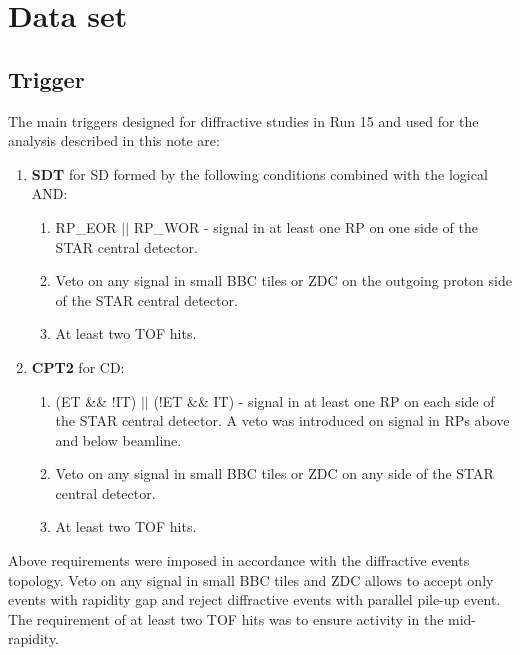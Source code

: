 

\chapter{Data set}\label{chap:dataset}
\section{Trigger}
The main triggers designed for diffractive studies in Run 15 and used for the analysis described in this note  are:
\begin{enumerate}[label=\alph*)]
	\item \textbf{SDT} for SD formed by the following conditions combined with the logical AND:
	\begin{enumerate}[label=\arabic*.]
		\item RP\_EOR $\vert\vert$ RP\_WOR - signal in at least one RP on one side of the STAR central detector.
		\item Veto on any signal in small BBC tiles or ZDC on the outgoing proton side of the STAR central detector.
		\item At least two TOF hits.
	\end{enumerate}
	\item \textbf{CPT2} for CD: 
	\begin{enumerate}[label=\arabic*.]
		\item (ET \&\& !IT) $\vert\vert$ (!ET \&\& IT) - signal in at least one RP on each side of the STAR central detector. A veto was introduced on signal in RPs above and below beamline.
		\item Veto on any signal in small BBC tiles or ZDC on any side of the STAR central detector.
		\item At least two TOF hits.
	\end{enumerate}
\end{enumerate}
Above requirements were imposed in accordance  with the diffractive events topology. Veto on any signal in small BBC tiles and ZDC allows to accept only events with rapidity gap and reject diffractive events with parallel pile-up event. The requirement of at least two TOF hits was to ensure activity in the mid-rapidity.

